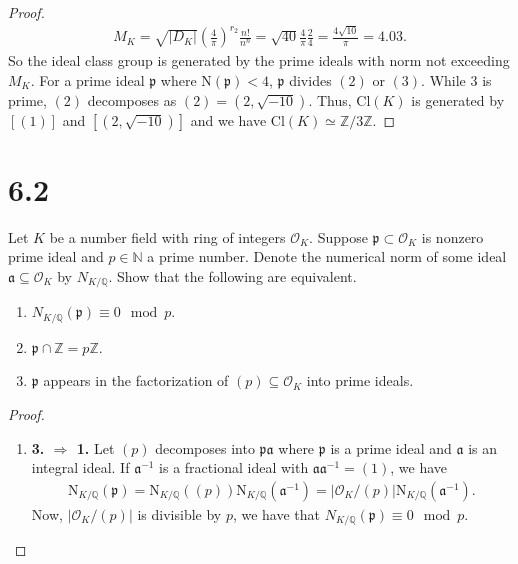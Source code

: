 \documentclass[a4paper]{article}
\begin{document}
\begin{enumerate}
\begin{proof}
\begin{align*}
                M_K = \sqrt{|D_K|} \left(\frac{4}{\pi}\right)^{r_2} \frac{n!}{n^n} = \sqrt{40} \frac{4}{\pi} \frac{2}{4} = \frac{4 \sqrt{10}}{\pi} = 4.03 \text{.}
            \end{align*}
            So the ideal class group is generated by the prime ideals with norm not exceeding \(M_K\). For a prime ideal \(\mathfrak{p}\) where \(\mathrm{N}(\mathfrak{p}) < 4\), \(\mathfrak{p}\) divides \((2)\) or \((3)\). While \(3\) is prime, \((2)\) decomposes as \((2) = (2, \sqrt{-10})\). Thus, \(\mathrm{Cl}(K)\) is generated by \([(1)]\) and \([(2, \sqrt{-10})]\) and we have \(\mathrm{Cl}(K) \simeq \mathbb{Z}/3\mathbb{Z}\).
        \end{proof}
\end{enumerate}

\section*{6.2}
Let \(K\) be a number field with ring of integers \(\mathcal{O}_K\). Suppose \(\mathfrak{p} \subset \mathcal{O}_K\) is nonzero prime ideal and \(p \in \mathbb{N}\) a prime number. Denote the numerical norm of some ideal \(\mathfrak{a} \subseteq \mathcal{O}_K\) by \(N_{K / \mathbb{Q}}\). Show that the following are equivalent.
\begin{enumerate}
    \item \(N_{K/\mathbb{Q}} (\mathfrak{p}) \equiv 0 \mod{p}\).
    \item \(\mathfrak{p} \cap \mathbb{Z} = p \mathbb{Z}\).
    \item \(\mathfrak{p}\) appears in the factorization of \((p) \subseteq \mathcal{O}_K\) into prime ideals.
\end{enumerate}
\begin{proof}
    \begin{enumerate}
        \item \textbf{3. \(\Rightarrow\) 1.} Let \((p)\) decomposes into \(\mathfrak{p} \mathfrak{a}\) where \(\mathfrak{p}\) is a prime ideal and \(\mathfrak{a}\) is an integral ideal. If \(\mathfrak{a}^{-1}\) is a fractional ideal with \(\mathfrak{a}\mathfrak{a}^{-1} = (1)\), we have
        \begin{align*}
            \mathrm{N}_{K/\mathbb{Q}}(\mathfrak{p}) = \mathrm{N}_{K/\mathbb{Q}}((p)) \mathrm{N}_{K/\mathbb{Q}}(\mathfrak{a}^{-1}) = |\mathcal{O}_K / (p)|\mathrm{N}_{K/\mathbb{Q}}(\mathfrak{a}^{-1}) \text{.}
        \end{align*}
        Now, \(|\mathcal{O}_K / (p)|\) is divisible by \(p\), we have that \(N_{K/\mathbb{Q}}(\mathfrak{p}) \equiv 0 \mod{p}\).
    \end{enumerate}
\end{proof}
\end{document}
